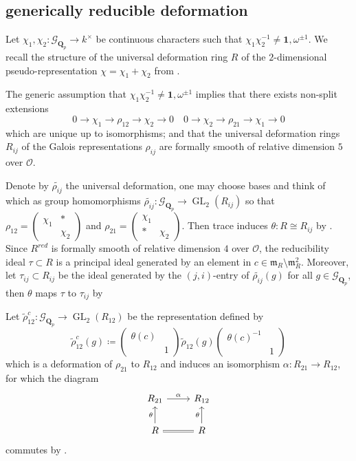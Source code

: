 \documentclass[leqno]{amsart}
\newcommand{\smat}[1]{\left( \begin{smallmatrix} #1 \end{smallmatrix} \right)}
\newcommand{\Gp}{\mathcal{G}_{\Qp}} %
\DeclareMathOperator{\GL}{GL}
\newcommand{\Qp}{\mathbf{Q}_p}
\newcommand{\oo}{\mathcal O}
\newcommand{\id}{\mathbf{1}}
\newcommand{\1}{\mathbf{1}}
\newcommand{\fm}{\mathfrak m}
\theoremstyle{definition}
\theoremstyle{remark}
\begin{document}
\subsection{generically reducible deformation}

Let $\chi_1,\chi_2\colon \Gp\to k^\times$ be continuous characters
such that $\chi_1\chi_2^{-1}\neq \id,\omega^{\pm1}$.
We recall 
the structure of the universal deformation ring $R$
of the $2$-dimensional pseudo-representation $\chi=\chi_1+\chi_2$ from \cite[\S B.1]{pask}.

The generic assumption that $\chi_1\chi_2^{-1}\neq \id,\omega^{\pm1}$
implies that there exists non-split extensions
\[
    0\to \chi_1\to \rho_{12}\to \chi_2\to 0\quad
    0\to \chi_2\to \rho_{21}\to \chi_1\to 0
\]
which are unique up to isomorphisms;
and that the universal deformation rings
$R_{ij}$ of the Galois representations $\rho_{ij}$
are formally smooth of relative dimension $5$ over $\oo$.

Denote by $\tilde{\rho_{ij}}$ the universal deformation,
one may choose bases and think of which as group homomorphisms
$\tilde{\rho_{ij}}\colon \Gp\to \GL_2(R_{ij})$
so that 
$\rho_{12}=\smat{\chi_1&*\\&\chi_2}$ and
$\rho_{21}=\smat{\chi_1&\\*&\chi_2}$.
Then trace induces $\theta\colon R\cong R_{ij}$ by \cite[Prop B.17]{pask}.
Since $R^{red}$ is formally smooth of relative dimension $4$ over  $\oo$,
the reducibility ideal  $\tau\subset R$ is a principal ideal generated by 
an element in $c\in\fm_R\setminus \fm_R^2$. 
Moreover, let $\tau_{ij}\subset R_{ij} $ be the ideal 
generated by the $(j,i)$-entry of  $ \tilde{\rho_{ij}}(g)$
for all $g\in \Gp$,
then  $\theta$ maps  $\tau$ to  $\tau_{ij}$ by \cite[Prop B.23]{pask}

Let $\tilde{\rho}_{12}^c\colon \Gp\to \GL_2(R_{12})$ be the representation defined by
\[
	\tilde{\rho}_{12}^c(g)\coloneqq 
	\smat{\theta(c)&\\&1}
	\tilde{\rho}_{12}(g)
	\smat{\theta(c)^{-1}&\\&1}
\]
which is a deformation of $\rho_{21}$ to $R_{12}$
and induces an isomorphism $\alpha\colon R_{21}\to R_{12}$,
for which the diagram
\[
	\begin{tikzcd}
		R_{21} \arrow[r,"\alpha"] &
		R_{12}\\
		R \arrow[u,"\theta"] \arrow[r,equal] &
		R \arrow[u,"\theta"]
	\end{tikzcd}
\]
commutes by \cite[Prop B.24]{pask}.
\end{document}
